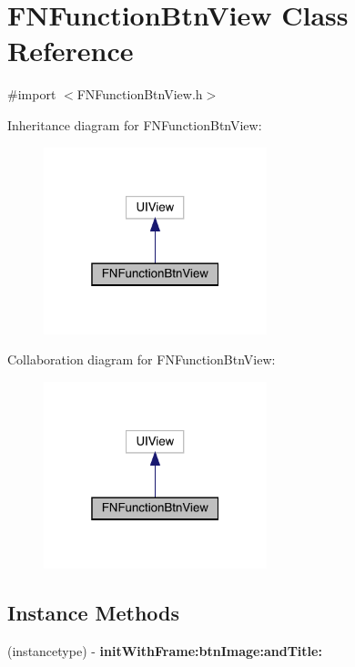 \hypertarget{interface_f_n_function_btn_view}{}\section{F\+N\+Function\+Btn\+View Class Reference}
\label{interface_f_n_function_btn_view}


{\ttfamily \#import $<$F\+N\+Function\+Btn\+View.\+h$>$}



Inheritance diagram for F\+N\+Function\+Btn\+View\+:\nopagebreak
\begin{figure}[H]
\begin{center}
\leavevmode
\includegraphics[width=184pt]{interface_f_n_function_btn_view__inherit__graph}
\end{center}
\end{figure}


Collaboration diagram for F\+N\+Function\+Btn\+View\+:\nopagebreak
\begin{figure}[H]
\begin{center}
\leavevmode
\includegraphics[width=184pt]{interface_f_n_function_btn_view__coll__graph}
\end{center}
\end{figure}
\subsection*{Instance Methods}
\begin{DoxyCompactItemize}
\item 
\mbox{\label{interface_f_n_function_btn_view_a5b31224dac3dc313fa3c3d8cf65a1074}} 
(instancetype) -\/ {\bfseries init\+With\+Frame\+:btn\+Image\+:and\+Title\+:}
\end{DoxyCompactItemize}
